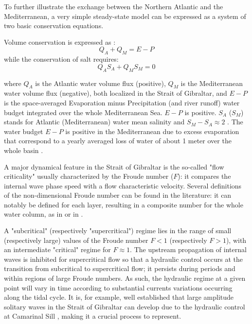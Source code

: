 To further illustrate the exchange between the Northern Atlantic and the Mediterranean, a very simple steady-state model can be expressed as a system of two basic conservation equations.

Volume conservation is expressed as : 
\begin{equation}  
	\label{Eq_mass}
    \displaystyle   
  	Q_A+Q_M = E-P
\end{equation}
while the conservation of salt requires: 
\begin{equation}  
    \label{Eq_salt}
    \displaystyle   
    Q_A S_A + Q_M S_M =  0
\end{equation}

\noindent where $Q_A$ is the Atlantic water volume flux  (positive), $Q_M$ is the Mediterranean water volume flux  (negative), both localized in the Strait of Gibraltar, and $E-P$ is the space-averaged Evaporation minus Precipitation (and river runoff) water budget integrated over the whole Mediterranean Sea. $E-P$ is positive. $S_A$ ($S_M$) stands for Atlantic (Mediterranean) water mean salinity and $ S_M - S_A \approx 2$ \citep{Beth79}. The water budget $E-P$ is positive in the Mediterranean due to excess evaporation that correspond to a yearly averaged loss of water of about 1 meter over the whole basin \citep{Garett90}.

A major dynamical feature in the Strait of Gibraltar is the so-called "flow criticality" usually characterized by the Froude number ($F$): it compares the internal wave phase speed with a flow characteristic velocity. Several definitions of the non-dimensional Froude number can be found in the literature: it can notably be defined for each layer, resulting in a composite number for the whole water column, as in \citet{FA1988} or in \citet{Sannino2009b}. 

A "subcritical" (respectively "supercritical") regime lies in the range of small (respectively large) values of the Froude number $F < 1$ (respectively $F>1$), with an intermediate "critical" regime for $F\approx 1$. The upstream propagation of internal waves is inhibited for supercritical flow so that a hydraulic control occurs at the transition from subcritical to supercritical flow; it persists during periods and within regions of large Froude numbers. As such, the hydraulic regime at a given point will vary in time according to substantial currents variations occurring along the tidal cycle. It is, for example, well established that large amplitude solitary waves in the Strait of Gibraltar can develop due to the hydraulic control at Camarinal Sill \citep{FA1988}, making it a crucial process to represent.

